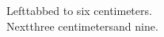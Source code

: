 \documentclass{article}
\begin{document}
Left\tabto{6cm}tabbed to six centimeters.\\
Next\tabto{3cm}three centimeters\tabto{9cm}and nine.
\end{document}
